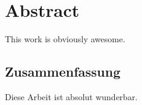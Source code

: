 \chapter*{Abstract}
This work is obviously awesome.

\begin{otherlanguage}{ngerman}
\chapter*{Zusammenfassung}
Diese Arbeit ist absolut wunderbar.
\end{otherlanguage}


